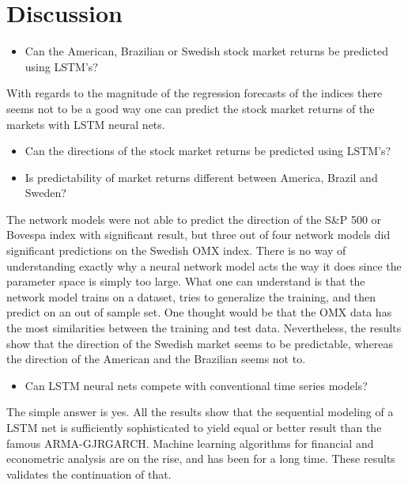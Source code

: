 \documentclass[12pt, letterpaper]{amsart}%
\begin{document}
\newpage

\section{Discussion}
\begin{itemize}
\item Can the American, Brazilian or Swedish stock market returns be predicted using LSTM's?
\end{itemize}
\vspace{0.5cm}

With regards to the magnitude of the regression forecasts of the indices there seems not to be a good way one can predict the stock market returns of the markets with LSTM neural nets.
\\

\begin{itemize}
\item Can the directions of the stock market returns be predicted using LSTM's?
\item Is predictability of market returns different between America, Brazil and Sweden?
\end{itemize}
\vspace{0.5cm}

The network models were not able to predict the direction of the S\&P 500 or Bovespa index with significant result, but three out of four network models did significant predictions on the Swedish OMX index. There is no way of understanding exactly why a neural network model acts the way it does since the parameter space is simply too large. What one can understand is that the network model trains on a dataset, tries to generalize the training, and then predict on an out of sample set. One thought would be that the OMX data has the most similarities between the training and test data. Nevertheless, the results show that the direction of the Swedish market seems to be predictable, whereas the direction of the American and the Brazilian seems not to.
\\

\begin{itemize}
\item Can LSTM neural nets compete with conventional time series models?
\end{itemize}
\vspace{0.5cm}

The simple answer is yes. All the results show that the sequential modeling of a LSTM net is sufficiently sophisticated to yield equal or better result than the famous ARMA-GJRGARCH. Machine learning algorithms for financial and econometric analysis are on the rise, and has been for a long time. These results validates the continuation of that.
\\
\end{document}
